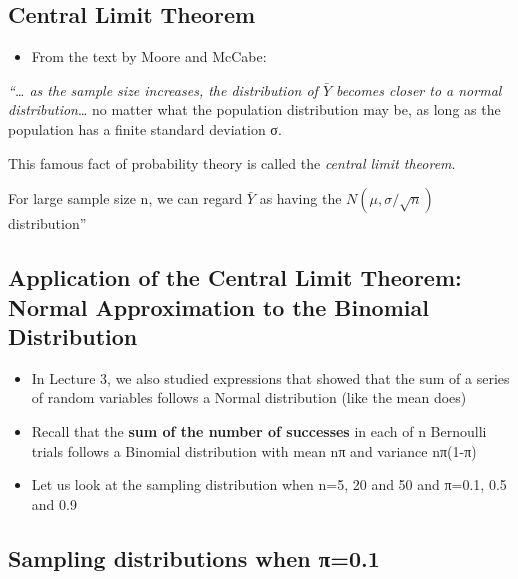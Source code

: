\documentclass[
]{book}
\providecommand{\tightlist}{%
  \setlength{\itemsep}{0pt}\setlength{\parskip}{0pt}}
\begin{document}
\hypertarget{central-limit-theorem-2}{%
\subsection{Central Limit Theorem}\label{central-limit-theorem-2}}

\begin{itemize}
\tightlist
\item
  From the text by Moore and McCabe:
\end{itemize}

\emph{``\ldots{} as the sample size increases, the distribution of \(\bar Y\) becomes closer to a normal distribution}\ldots{} no matter what the population distribution may be, as long as the population has a finite standard deviation σ.

This famous fact of probability theory is called the \emph{central limit theorem}.

For large sample size n, we can regard \(\bar Y\) as having the \(N(\mu,\sigma/\sqrt n)\) distribution''

\hypertarget{application-of-the-central-limit-theorem-normal-approximation-to-the-binomial-distribution}{%
\subsection{Application of the Central Limit Theorem: Normal Approximation to the Binomial Distribution}\label{application-of-the-central-limit-theorem-normal-approximation-to-the-binomial-distribution}}

\begin{itemize}
\tightlist
\item
  In Lecture 3, we also studied expressions that showed that the sum of a series of random variables follows a Normal distribution (like the mean does)
\item
  Recall that the \textbf{sum of the number of successes} in each of n Bernoulli trials follows a Binomial distribution with mean nπ and variance nπ(1-π)
\item
  Let us look at the sampling distribution when n=5, 20 and 50 and π=0.1, 0.5 and 0.9
\end{itemize}

\hypertarget{sampling-distributions-when-ux3c00.1}{%
\subsection{Sampling distributions when π=0.1}\label{sampling-distributions-when-ux3c00.1}}
\end{document}
